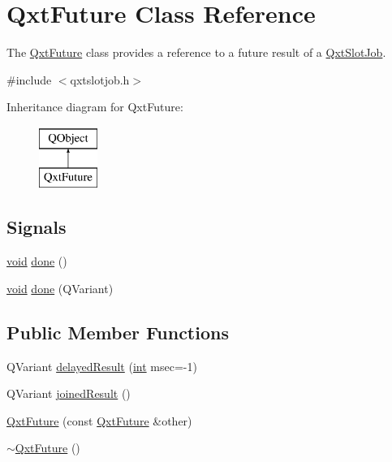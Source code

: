 \hypertarget{class_qxt_future}{\section{Qxt\-Future Class Reference}
\label{class_qxt_future}
}


The \hyperlink{class_qxt_future}{Qxt\-Future} class provides a reference to a future result of a \hyperlink{class_qxt_slot_job}{Qxt\-Slot\-Job}.  




{\ttfamily \#include $<$qxtslotjob.\-h$>$}

Inheritance diagram for Qxt\-Future\-:\begin{figure}[H]
\begin{center}
\leavevmode
\includegraphics[height=2.000000cm]{class_qxt_future}
\end{center}
\end{figure}
\subsection*{Signals}
\begin{DoxyCompactItemize}
\item 
\hyperlink{group___u_a_v_objects_plugin_ga444cf2ff3f0ecbe028adce838d373f5c}{void} \hyperlink{class_qxt_future_aaf95d390e7b66b3f7fbaecbfa71ea84e}{done} ()
\item 
\hyperlink{group___u_a_v_objects_plugin_ga444cf2ff3f0ecbe028adce838d373f5c}{void} \hyperlink{class_qxt_future_ad4d92c3d13f657a1ae1add7a72878022}{done} (Q\-Variant)
\end{DoxyCompactItemize}
\subsection*{Public Member Functions}
\begin{DoxyCompactItemize}
\item 
Q\-Variant \hyperlink{class_qxt_future_a58eb4615eb20b0ddf4a9d57a33040cee}{delayed\-Result} (\hyperlink{ioapi_8h_a787fa3cf048117ba7123753c1e74fcd6}{int} msec=-\/1)
\item 
Q\-Variant \hyperlink{class_qxt_future_a3e160ab1ebbbc957233ffe7c337cc224}{joined\-Result} ()
\item 
\hyperlink{class_qxt_future_a01d6c807023b7b38e044d7c1edf2eb29}{Qxt\-Future} (const \hyperlink{class_qxt_future}{Qxt\-Future} \&other)
\item 
\hyperlink{class_qxt_future_a227ebddc0c997bc3c6663a3231907f9d}{$\sim$\-Qxt\-Future} ()
\end{DoxyCompactItemize}
